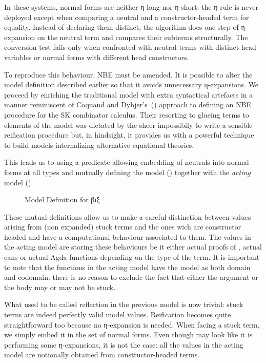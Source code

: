 In these systems, normal forms are neither η-long nor η-short: the η-rule is
never deployed except when comparing a neutral and a constructor-headed term
for equality. Instead of declaring
them distinct, the algorithm does one step of η-expansion on the
neutral term and compares their subterms structurally. The conversion test
fails only when confronted with neutral terms with distinct head
variables or normal forms with different head constructors.

To reproduce this behaviour, NBE must be amended.
It is possible to alter the model definition described earlier so that it
avoids unnecessary η-expansions. We proceed by enriching the traditional
model with extra syntactical artefacts in a manner reminiscent of Coquand
and Dybjer's~(\citeyear{CoqDybSK}) approach to defining an NBE procedure for the SK combinator calculus. Their resorting to glueing
terms to elements of the model was dictated by the sheer impossibily to write
a sensible reification procedure but, in hindsight, it provides us with a
powerful technique to build models internalizing alternative equational
theories.

This leads us to using a predicate  allowing embedding of neutrals
into normal forms at all types and mutually defining the model ()
together with the \emph{acting} model ().

\begin{figure}[h]
\caption{Model Definition for βιξ\label{nbestuckmodel}}
\end{figure}

These mutual definitions allow us to make a careful distinction between values
arising from (non expanded) stuck terms and the ones wich are constructor headed
and have a computational behaviour associated to them. The values in the acting
model are storing these behaviours be it either actual proofs of , actual
eans or actual Agda functions depending on the type of the term. It is
important to note that the functions in the acting model have the model as both
domain and codomain: there is no reason to exclude the fact that either the argument
or the body may or may not be stuck.



What used to be called reflection in the previous model is now trivial:
stuck terms are indeed perfectly valid model values. Reification becomes
quite straightforward too because no η-expansion is needed. When facing
a stuck term, we simply embed it in the set of normal forms. Even though
 may look like it is performing some η-expansions, it is not
the case: all the values in the acting model are notionally obtained
from constructor-headed terms.

